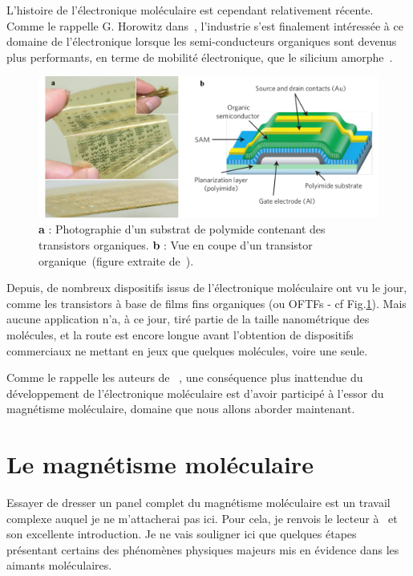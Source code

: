 L'histoire de l'électronique moléculaire est cependant relativement récente. Comme le rappelle G. Horowitz dans~\cite{Klauk2007}, l'industrie s'est finalement intéressée à ce domaine de l'électronique lorsque les semi-conducteurs organiques sont devenus plus performants, en terme de mobilité électronique, que le silicium amorphe~\cite{Lin1997}.
\begin{figure}
\centering \includegraphics[scale=0.45]{Spintronique/MolecularElec/MolecularElec.pdf}
\caption{\textbf{a} : Photographie d'un substrat de polymide contenant des transistors organiques. \textbf{b} : Vue en coupe d'un transistor organique~(figure extraite de~\cite{Sekitani2010}).}
\label{MolecularElec}
\end{figure}


Depuis, de nombreux dispositifs issus de l'électronique moléculaire ont vu le jour, comme les  transistors à base de films fins organiques (ou OFTFs - cf Fig.\ref{MolecularElec}). Mais aucune application n'a, à ce jour, tiré partie de la taille nanométrique des molécules, et la route est encore longue avant l'obtention de dispositifs commerciaux ne mettant en jeux que quelques molécules, voire une seule.

Comme le rappelle les auteurs de~\cite{Gatteschi2006} , une conséquence plus inattendue du développement de l'électronique moléculaire est d'avoir participé à l'essor du magnétisme moléculaire, domaine que nous allons aborder maintenant.


\section{Le magnétisme moléculaire}
Essayer de dresser un panel complet du magnétisme moléculaire est un travail complexe auquel je ne m'attacherai pas ici. Pour cela, je renvois le lecteur à~\cite{Gatteschi2006} et son excellente introduction. Je ne vais souligner ici que quelques étapes présentant certains des phénomènes physiques majeurs mis en évidence dans les aimants moléculaires.

